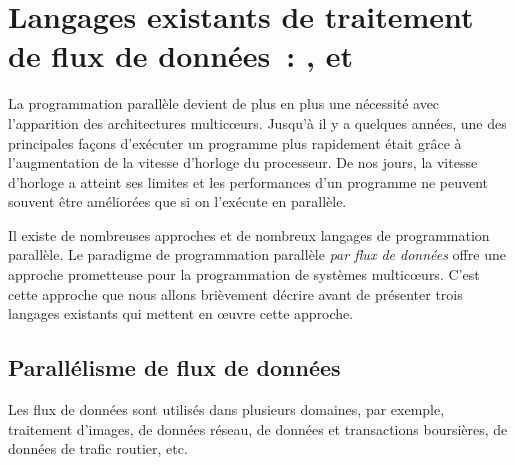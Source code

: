 
\chapter{Langages existants de traitement de flux de donn\'ees~: ,  et }
\label{outils_connus}
\label{outils_connus.chap}








La programmation parall\`ele devient de plus en plus une n\'ecessit\'e avec l'apparition des architectures multicœurs. Jusqu'\`a il y a quelques ann\'ees, une des principales fa\c{c}ons d'ex\'ecuter un programme plus rapidement \'etait gr\^ace \`a l'augmentation de la vitesse d'horloge du processeur. De nos jours, la vitesse d'horloge a atteint ses limites et les performances d'un programme ne peuvent souvent \^etre am\'elior\'ees que si on l'ex\'ecute en parall\`ele. 

Il existe de nombreuses approches et de nombreux langages de programmation parall\`ele.
%
Le paradigme de programmation parall\`ele \emph{par flux de donn\'ees} offre une approche prometteuse pour la programmation de syst\`emes multicœurs. C'est cette approche que nous allons bri\`evement d\'ecrire avant de pr\'esenter trois langages existants qui mettent en \oe{}uvre cette approche.

\section{Parall\'elisme de flux de donn\'ees}


Les flux de donn\'ees sont utilis\'es dans plusieurs domaines, par exemple, traitement d'images, de donn\'ees r\'eseau, de donn\'ees et transactions boursi\`eres, de donn\'ees de trafic routier, etc.

